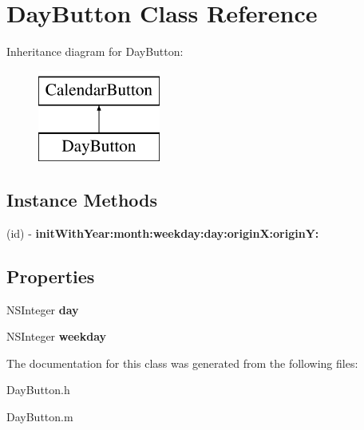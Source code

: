 \hypertarget{interface_day_button}{\section{Day\+Button Class Reference}
\label{interface_day_button}
}
Inheritance diagram for Day\+Button\+:\begin{figure}[H]
\begin{center}
\leavevmode
\includegraphics[height=3.000000cm]{interface_day_button}
\end{center}
\end{figure}
\subsection*{Instance Methods}
\begin{DoxyCompactItemize}
\item 
\hypertarget{interface_day_button_aaa3527d1ba28e02fbccf327df41bff5f}{(id) -\/ {\bfseries init\+With\+Year\+:month\+:weekday\+:day\+:origin\+X\+:origin\+Y\+:}}\label{interface_day_button_aaa3527d1ba28e02fbccf327df41bff5f}

\end{DoxyCompactItemize}
\subsection*{Properties}
\begin{DoxyCompactItemize}
\item 
\hypertarget{interface_day_button_a1a1e6a38a27c7ffafcd2b47c9e677ce3}{N\+S\+Integer {\bfseries day}}\label{interface_day_button_a1a1e6a38a27c7ffafcd2b47c9e677ce3}

\item 
\hypertarget{interface_day_button_a992bfe27780dcf5616639d4259a7b1b6}{N\+S\+Integer {\bfseries weekday}}\label{interface_day_button_a992bfe27780dcf5616639d4259a7b1b6}

\end{DoxyCompactItemize}


The documentation for this class was generated from the following files\+:\begin{DoxyCompactItemize}
\item 
Day\+Button.\+h\item 
Day\+Button.\+m\end{DoxyCompactItemize}
